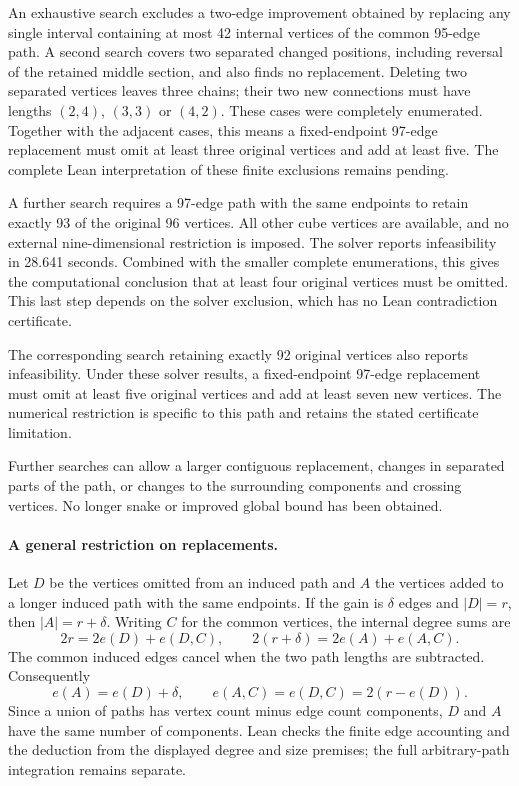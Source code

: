 \documentclass[11pt,a4paper]{article}
\begin{document}
An exhaustive search excludes a two-edge improvement obtained by replacing
any single interval containing at most 42 internal vertices of the common
95-edge path. A second search covers two separated changed positions,
including reversal of the retained middle section, and also finds
no replacement. Deleting two separated vertices leaves three chains;
their two new connections must have lengths $(2,4)$, $(3,3)$ or $(4,2)$.
These cases were completely enumerated. Together with the adjacent
cases, this means a fixed-endpoint 97-edge replacement must omit at
least three original vertices and add at least five. The complete
Lean interpretation of these finite exclusions remains pending.

A further search requires a 97-edge path with the same endpoints
to retain exactly 93 of the original 96 vertices. All other cube vertices
are available, and no external nine-dimensional restriction is imposed.
The solver reports infeasibility in 28.641 seconds. Combined with the
smaller complete enumerations, this gives the computational conclusion
that at least four original vertices must be omitted. This last step
depends on the solver exclusion, which has no Lean contradiction
certificate.

The corresponding search retaining exactly 92 original vertices
also reports infeasibility. Under these solver results, a fixed-endpoint
97-edge replacement must omit at least five original vertices and add
at least seven new vertices. The numerical restriction is specific to
this path and retains the stated certificate limitation.


Further searches can allow a larger contiguous replacement, changes
in separated parts of the path, or changes to the surrounding components
and crossing vertices. No longer snake or improved global bound has been
obtained.


\paragraph{A general restriction on replacements.}
Let $D$ be the vertices omitted from an induced path and $A$ the vertices
added to a longer induced path with the same endpoints. If the gain is
$\delta$ edges and $|D|=r$, then $|A|=r+\delta$. Writing $C$ for the
common vertices, the internal degree sums are
\[
2r=2e(D)+e(D,C),\qquad
2(r+\delta)=2e(A)+e(A,C).
\]
The common induced edges cancel when the two path lengths are subtracted.
Consequently
\[
e(A)=e(D)+\delta,\qquad e(A,C)=e(D,C)=2(r-e(D)).
\]
Since a union of paths has vertex count minus edge count components,
$D$ and $A$ have the same number of components. Lean checks the finite
edge accounting and the deduction from the displayed degree and size
premises; the full arbitrary-path integration remains separate.
\end{document}
